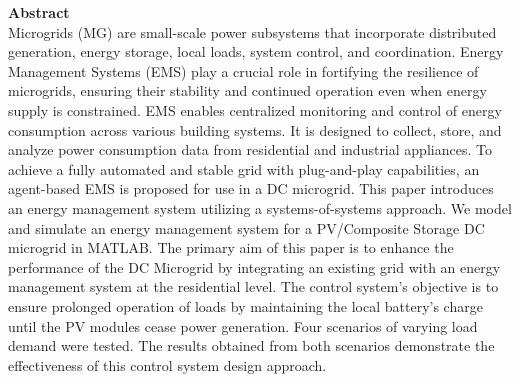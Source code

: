 \textbf{Abstract}
\vspace{0.2cm}\vspace{0.2cm}\vspace{0.2cm}\vspace{0.2cm}
\\Microgrids (MG) are small-scale power subsystems that incorporate distributed generation, energy storage, local loads, system control, and coordination. Energy Management Systems (EMS) play a crucial role in fortifying the resilience of microgrids, ensuring their stability and continued operation even when energy supply is constrained. EMS enables centralized monitoring and control of energy consumption across various building systems. It is designed to collect, store, and analyze power consumption data from residential and industrial appliances.
To achieve a fully automated and stable grid with plug-and-play capabilities, an agent-based EMS is proposed for use in a DC microgrid. This paper introduces an energy management system utilizing a systems-of-systems approach. We model and simulate an energy management system for a PV/Composite Storage DC microgrid in MATLAB. The primary aim of this paper is to enhance the performance of the DC Microgrid by integrating an existing grid with an energy management system at the residential level. The control system's objective is to ensure prolonged operation of loads by maintaining the local battery's charge until the PV modules cease power generation. Four scenarios of varying load demand were tested. The results obtained from both scenarios demonstrate the effectiveness of this control system design approach.